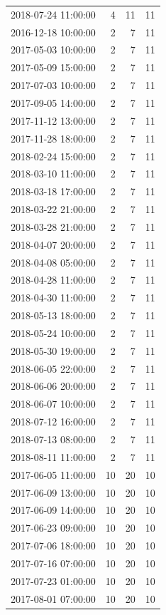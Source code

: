 \begin{tabular}{lrrr}
2018-07-24 11:00:00 & 4 & 11 & 11 \\
2016-12-18 10:00:00 & 2 & 7 & 11 \\
2017-05-03 10:00:00 & 2 & 7 & 11 \\
2017-05-09 15:00:00 & 2 & 7 & 11 \\
2017-07-03 10:00:00 & 2 & 7 & 11 \\
2017-09-05 14:00:00 & 2 & 7 & 11 \\
2017-11-12 13:00:00 & 2 & 7 & 11 \\
2017-11-28 18:00:00 & 2 & 7 & 11 \\
2018-02-24 15:00:00 & 2 & 7 & 11 \\
2018-03-10 11:00:00 & 2 & 7 & 11 \\
2018-03-18 17:00:00 & 2 & 7 & 11 \\
2018-03-22 21:00:00 & 2 & 7 & 11 \\
2018-03-28 21:00:00 & 2 & 7 & 11 \\
2018-04-07 20:00:00 & 2 & 7 & 11 \\
2018-04-08 05:00:00 & 2 & 7 & 11 \\
2018-04-28 11:00:00 & 2 & 7 & 11 \\
2018-04-30 11:00:00 & 2 & 7 & 11 \\
2018-05-13 18:00:00 & 2 & 7 & 11 \\
2018-05-24 10:00:00 & 2 & 7 & 11 \\
2018-05-30 19:00:00 & 2 & 7 & 11 \\
2018-06-05 22:00:00 & 2 & 7 & 11 \\
2018-06-06 20:00:00 & 2 & 7 & 11 \\
2018-06-07 10:00:00 & 2 & 7 & 11 \\
2018-07-12 16:00:00 & 2 & 7 & 11 \\
2018-07-13 08:00:00 & 2 & 7 & 11 \\
2018-08-11 11:00:00 & 2 & 7 & 11 \\
2017-06-05 11:00:00 & 10 & 20 & 10 \\
2017-06-09 13:00:00 & 10 & 20 & 10 \\
2017-06-09 14:00:00 & 10 & 20 & 10 \\
2017-06-23 09:00:00 & 10 & 20 & 10 \\
2017-07-06 18:00:00 & 10 & 20 & 10 \\
2017-07-16 07:00:00 & 10 & 20 & 10 \\
2017-07-23 01:00:00 & 10 & 20 & 10 \\
2017-08-01 07:00:00 & 10 & 20 & 10 \\

\end{tabular}
